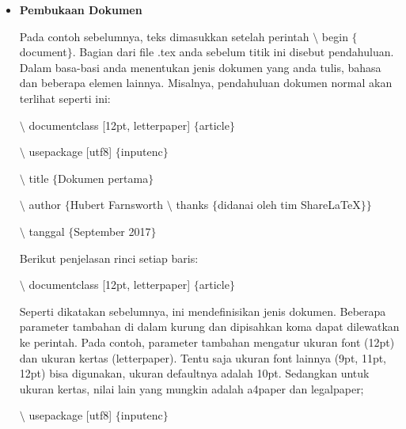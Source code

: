 \begin{itemize}
\vspace{10pt}
	\item {\fontsize{14pt}{14pt}\selectfont \textbf{Pembukaan Dokumen}}\par
\vspace{\baselineskip}
Pada contoh sebelumnya, teks dimasukkan setelah perintah $\setminus$ begin $ \{ $document$ \} $. Bagian dari file .tex anda sebelum titik ini disebut pendahuluan. Dalam basa-basi anda menentukan jenis dokumen yang anda tulis, bahasa dan beberapa elemen lainnya. Misalnya, pendahuluan dokumen normal akan terlihat seperti ini:\par
\vspace{\baselineskip}
\hspace*{0.5in}$\setminus$ documentclass [12pt, letterpaper] $ \{ $article$ \} $\par
\vspace{\baselineskip}
\hspace*{0.5in}$\setminus$ usepackage [utf8] $ \{ $inputenc$ \} $\par

\hspace*{0.5in}$\setminus$ title $ \{ $Dokumen pertama$ \} $\par
\vspace{\baselineskip}

$\setminus$ author $ \{ $Hubert Farnsworth $\setminus$ thanks $ \{ $didanai oleh tim ShareLaTeX$ \} $$ \} $\par

\hspace*{0.5in}$\setminus$ tanggal $ \{ $September 2017$ \} $\par
\vspace{\baselineskip}
Berikut penjelasan rinci setiap baris:\par
\vspace{\baselineskip}
$\setminus$ documentclass [12pt, letterpaper] $ \{ $article$ \} $\par
\vspace{\baselineskip}
\hspace*{0.5in}Seperti dikatakan sebelumnya, ini mendefinisikan jenis dokumen. Beberapa parameter tambahan di dalam kurung dan dipisahkan koma dapat dilewatkan ke perintah. Pada contoh, parameter tambahan mengatur ukuran font (12pt) dan ukuran kertas (letterpaper). Tentu saja ukuran font lainnya (9pt, 11pt, 12pt) bisa digunakan, ukuran defaultnya adalah 10pt. Sedangkan untuk ukuran kertas, nilai lain yang mungkin adalah a4paper dan legalpaper; \par
\vspace{\baselineskip}
$\setminus$ usepackage [utf8] $ \{ $inputenc$ \} $\par


\end{itemize}

